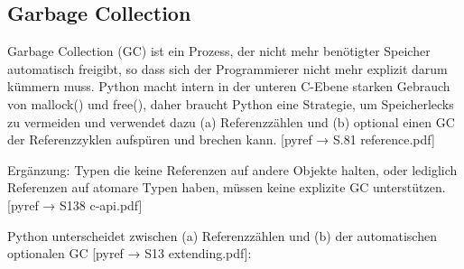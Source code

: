 \subsection{Garbage Collection}


Garbage Collection (GC) ist ein Prozess, der nicht mehr benötigter Speicher
automatisch freigibt, so dass sich der Programmierer nicht mehr explizit
darum kümmern muss. Python macht intern in der unteren C-Ebene starken
Gebrauch von mallock() und free(), daher braucht Python eine Strategie, um
Speicherlecks zu vermeiden und verwendet dazu (a) Referenzzählen und (b)
optional einen GC der Referenzzyklen aufspüren und brechen kann.
[pyref → S.81 reference.pdf]

Ergänzung: Typen die keine Referenzen auf andere Objekte halten, oder
lediglich Referenzen auf atomare Typen haben, müssen keine explizite GC
unterstützen. [pyref → S138 c-api.pdf]

Python unterscheidet zwischen (a) Referenzzählen und (b) der automatischen
optionalen GC [pyref → S13 extending.pdf]:


